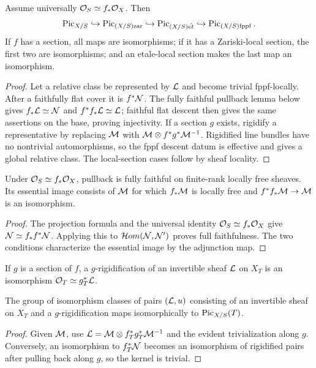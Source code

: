 \begin{theorem}[Comparison]\label{kps-thm-comparison}
Assume universally $\mathcal O_S\simeq f_*\mathcal O_X$. Then
\[\operatorname{Pic}_{X/S}\hookrightarrow\operatorname{Pic}_{(X/S)\mathrm{zar}}\hookrightarrow
\operatorname{Pic}_{(X/S)\acute{\mathrm{e}t}}\hookrightarrow\operatorname{Pic}_{(X/S)\mathrm{fppf}}.\]
If $f$ has a section, all maps are isomorphisms; if it has a Zariski-local
section, the first two are isomorphisms; and an etale-local section makes the
last map an isomorphism.
\end{theorem}
\begin{proof}
Let a relative class be represented by $\mathcal L$ and become trivial fppf-locally.
After a faithfully flat cover it is $f^*\mathcal N$. The fully faithful pullback lemma
below gives $f_*\mathcal L\simeq\mathcal N$ and $f^*f_*\mathcal L\simeq\mathcal L$; faithful flat descent
then gives the same assertions on the base, proving injectivity. If a section
$g$ exists, rigidify a representative by replacing $\mathcal M$ with
$\mathcal M\otimes f^*g^*\mathcal M^{-1}$. Rigidified line bundles have no nontrivial
automorphisms, so the fppf descent datum is effective and gives a global
relative class. The local-section cases follow by sheaf locality.
\end{proof}

\begin{lemma}\label{kps-lem-fully-faithful}
Under $\mathcal O_S\simeq f_*\mathcal O_X$, pullback is fully faithful on finite-rank locally
free sheaves. Its essential image consists of $\mathcal M$ for which $f_*\mathcal M$ is
locally free and $f^*f_*\mathcal M\to\mathcal M$ is an isomorphism.
\end{lemma}
\begin{proof}
The projection formula and the universal identity $\mathcal O_S\simeq f_*\mathcal O_X$
give $\mathcal N\simeq f_*f^*\mathcal N$. Applying this to $\mathcal Hom(\mathcal N,\mathcal N')$ proves
full faithfulness. The two conditions characterize the essential image by the
adjunction map.
\end{proof}

\begin{definition}[Rigidification]\label{kps-def-rigidification}
If $g$ is a section of $f$, a $g$-rigidification of an invertible sheaf $\mathcal L$
on $X_T$ is an isomorphism $\mathcal O_T\simeq g_T^*\mathcal L$.
\end{definition}

\begin{lemma}\label{kps-lem-rigidification}
The group of isomorphism classes of pairs $(\mathcal L,u)$ consisting of an invertible
sheaf on $X_T$ and a $g$-rigidification maps isomorphically to
$\operatorname{Pic}_{X/S}(T)$.
\end{lemma}
\begin{proof}
Given $\mathcal M$, use $\mathcal L=\mathcal M\otimes f_T^*g_T^*\mathcal M^{-1}$ and the evident
trivialization along $g$. Conversely, an isomorphism to $f_T^*\mathcal N$ becomes an
isomorphism of rigidified pairs after pulling back along $g$, so the kernel is
trivial.
\end{proof}

